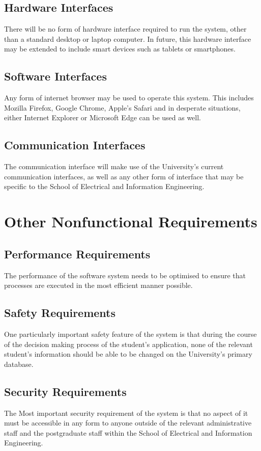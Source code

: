 \documentclass[journal,comsoc,onecolumn]{IEEEtran}
\begin{document}
\subsection{Hardware Interfaces}
There will be no form of hardware interface required to run the system, other than a standard desktop or laptop computer. In future, this hardware interface may be extended to include smart devices such as tablets or smartphones.

\subsection{Software Interfaces}
Any form of internet browser may be used to operate this system. This includes Mozilla Firefox, Google Chrome, Apple’s Safari and in desperate situations, either Internet Explorer or Microsoft Edge can be used as well.

\subsection{Communication Interfaces}
The communication interface will make use of the University’s current communication interfaces, as well as any other form of interface that may be specific to the School of Electrical and Information Engineering.

\section{Other Nonfunctional Requirements}

\subsection{Performance Requirements}
The performance of the software system needs to be optimised to ensure that processes are executed in the most efficient manner possible.

\subsection{Safety Requirements}
One particularly important safety feature of the system is that during the course of the decision making process of the student’s application, none of the relevant student’s information should be able to be changed on the University’s primary database.

\subsection{Security Requirements}
The Most important security requirement of the system is that no aspect of it must be accessible in any form to anyone outside of the relevant administrative staff and the postgraduate staff within the School of Electrical and Information Engineering.
\end{document}

